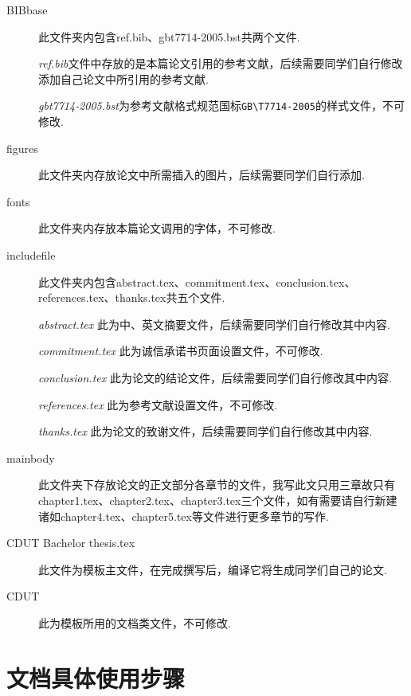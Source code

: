 \begin{description}
  \item[BIBbase]  此文件夹内包含ref.bib、gbt7714-2005.bst共两个文件.\par 
  \textit{ref.bib}文件中存放的是本篇论文引用的参考文献，后续需要同学们自行修改添加自己论文中所引用的参考文献.\par
  \textit{gbt7714-2005.bst}为参考文献格式规范国标\verb|GB\T7714-2005|的样式文件，不可修改.
  
  \item[figures]  此文件夹内存放论文中所需插入的图片，后续需要同学们自行添加.

  \item[fonts]  此文件夹内存放本篇论文调用的字体，不可修改.

  \item[includefile]  此文件夹内包含abstract.tex、commitment.tex、conclusion.tex、references.tex、thanks.tex共五个文件.\par
  \textit{abstract.tex}  此为中、英文摘要文件，后续需要同学们自行修改其中内容.\par
  \textit{commitment.tex}  此为诚信承诺书页面设置文件，不可修改.\par
  \textit{conclusion.tex}  此为论文的结论文件，后续需要同学们自行修改其中内容.\par
  \textit{references.tex}  此为参考文献设置文件，不可修改.\par
  \textit{thanks.tex}  此为论文的致谢文件，后续需要同学们自行修改其中内容.
  
  \item[mainbody]  此文件夹下存放论文的正文部分各章节的文件，我写此文只用三章故只有chapter1.tex、chapter2.tex、chapter3.tex三个文件，如有需要请自行新建诸如chapter4.tex、chapter5.tex等文件进行更多章节的写作.
  
  \item[CDUT Bachelor thesis.tex]  此文件为模板主文件，在完成撰写后，编译它将生成同学们自己的论文.
  
  \item[CDUT]  此为模板所用的文档类文件，不可修改.
  
\end{description}


\section{文档具体使用步骤}

